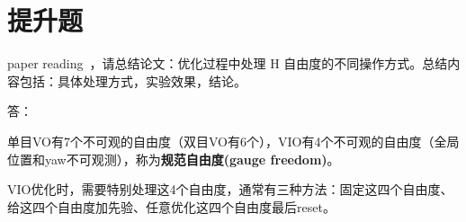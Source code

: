 \documentclass[12pt,a4paper]{article}
\begin{document}
\newpage

\section*{提升题}

paper reading~\cite{zhang2018comparison}，请总结论文：优化过程中处理 H 自由度的不同操作方式。总结内容包括：具体处理方式，实验效果，结论。\newline

答：  

单目VO有7个不可观的自由度（双目VO有6个），VIO有4个不可观的自由度（全局位置和yaw不可观测），称为\textbf{规范自由度(gauge freedom)}。

VIO优化时，需要特别处理这4个自由度，通常有三种方法：固定这四个自由度、给这四个自由度加先验、任意优化这四个自由度最后reset。
\end{document}
